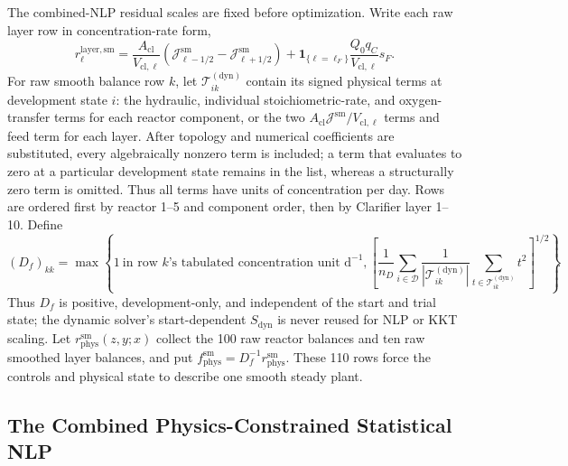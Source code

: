 \documentclass[a4paper,fleqn]{cas-sc}
\begin{document}
The combined-NLP residual scales are fixed before optimization. Write each raw layer row in concentration-rate form,
\begin{equation}
r_\ell^{\mathrm{layer,sm}}=
\frac{A_{\mathrm{cl}}}{V_{\mathrm{cl},\ell}}
(\mathcal J_{\ell-1/2}^{\mathrm{sm}}-\mathcal J_{\ell+1/2}^{\mathrm{sm}})
+\mathbf1_{\{\ell=\ell_F\}}\frac{Q_0q_C}{V_{\mathrm{cl},\ell}}s_F.
\end{equation}
For raw smooth balance row $k$, let $\mathcal T^{(\mathrm{dyn})}_{ik}$ contain its signed physical terms at development state $i$: the hydraulic, individual stoichiometric-rate, and oxygen-transfer terms for each reactor component, or the two $A_{\mathrm{cl}}\mathcal J^{\mathrm{sm}}/V_{\mathrm{cl},\ell}$ terms and feed term for each layer. After topology and numerical coefficients are substituted, every algebraically nonzero term is included; a term that evaluates to zero at a particular development state remains in the list, whereas a structurally zero term is omitted. Thus all terms have units of concentration per day. Rows are ordered first by reactor 1--5 and component order, then by Clarifier layer 1--10. Define
\begin{equation}
\label{eq:combined_nlp_scale}
(D_f)_{kk}=\max\!\left\{1\ \text{in row $k$'s tabulated concentration unit d}^{-1},
\left[\frac1{n_D}\sum_{i\in\mathcal D}
\frac1{|\mathcal T^{(\mathrm{dyn})}_{ik}|}
\sum_{t\in\mathcal T^{(\mathrm{dyn})}_{ik}}t^2\right]^{1/2}\right\}.
\end{equation}
Thus $D_f$ is positive, development-only, and independent of the start and trial state; the dynamic solver's start-dependent $S_{\mathrm{dyn}}$ is never reused for NLP or KKT scaling. Let $r_{\mathrm{phys}}^{\mathrm{sm}}(z,y;x)$ collect the 100 raw reactor balances and ten raw smoothed layer balances, and put $f_{\mathrm{phys}}^{\mathrm{sm}}=D_f^{-1}r_{\mathrm{phys}}^{\mathrm{sm}}$. These 110 rows force the controls and physical state to describe one smooth steady plant.

\subsection{The Combined Physics-Constrained Statistical NLP}
\end{document}
